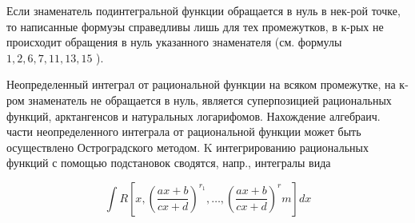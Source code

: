 \documentclass[10pt]{article}
\begin{document}
Если знаменатель подинтегральной функции обращается в нуль в нек-рой точке, то написанные формуэы справедливы лишь для тех промежутков, в к-рых не происходит обращения в нуль указанного знаменателя (см. формулы $1,2,6,7,11,13,15$ ).



Неопределенный интеграл от рациональной функции на всяком промежутке, на к-ром знаменатель не обращается в нуль, является суперпозицией рациональных функций, арктангенсов и натуральных логарифомов. Нахождение алгебраич. части неопределенного интеграла от рациональной функции может быть осуществлено Остроградского методом. $\mathrm{K}$ интегрированию рациональных функций с помощью подстановок сводятся, напр., интегралы вида



\[

\int R\left[x,\left(\frac{a x+b}{c x+d}\right)^{r_{1}}, \ldots,\left(\frac{a x+b}{c x+d}\right)^{r} m\right] d x

\]
\end{document}
